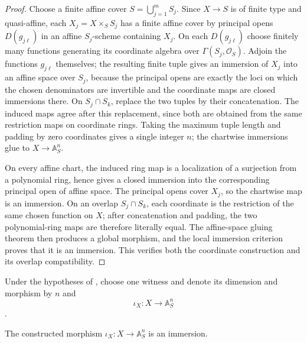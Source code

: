 \begin{proof}
  Choose a finite affine cover $S=\bigcup_{j=1}^mS_j$.  Since $X\to S$ is of
  finite type and quasi-affine, each $X_j=X\times_SS_j$ has a finite affine
  cover by principal opens $D(g_{j\ell})$ in an affine $S_j$-scheme containing
  $X_j$.  On each $D(g_{j\ell})$ choose finitely many functions generating its
  coordinate algebra over $\Gamma(S_j,\mathcal O_S)$.  Adjoin the functions
  $g_{j\ell}$ themselves; the resulting finite tuple gives an immersion of
  $X_j$ into an affine space over $S_j$, because the principal opens are
  exactly the loci on which the chosen denominators are invertible and the
  coordinate maps are closed immersions there.  On $S_j\cap S_k$, replace the
  two tuples by their concatenation.  The induced maps agree after this
  replacement, since both are obtained from the same restriction maps on
  coordinate rings.  Taking the maximum tuple length and padding by zero
  coordinates gives a single integer $n$; the chartwise immersions glue to
  $X\to\mathbb A^n_S$.

  On every affine chart, the induced ring map is a localization of a
  surjection from a polynomial ring, hence gives a closed immersion into the
  corresponding principal open of affine space.  The principal opens cover
  $X_j$, so the chartwise map is an immersion.  On an overlap $S_j\cap S_k$,
  each coordinate is the restriction of the same chosen function on $X$;
  after concatenation and padding, the two polynomial-ring maps are therefore
  literally equal.  The affine-space gluing theorem then produces a global
  morphism, and the local immersion criterion proves that it is an immersion.
  This verifies both the coordinate construction and its overlap
  compatibility.
\end{proof}

\begin{definition}
  \label{def:nagata-quasi-affine-immersion-affine-space}

  Under the hypotheses of
  , choose one
  witness and denote its dimension and morphism by $n$ and
  \[
    \iota_X\colon X\longrightarrow\mathbb A^n_S
  \].
\end{definition}

\begin{lemma}
  \label{lemma:nagata-quasi-affine-immersion-affine-space}

  The constructed morphism
  $\iota_X\colon X\to\mathbb A^n_S$ is an immersion.
\end{lemma}

